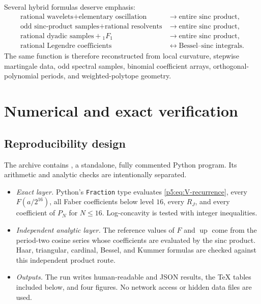 \documentclass[11pt,oneside]{article}
\theoremstyle{definition}
\newcommand{\Up}{\operatorname{up}}
\begin{document}
Several hybrid formulas deserve emphasis:
\begin{align}
 \text{rational wavelets}+\text{elementary oscillation}
 &\longrightarrow \text{entire sinc product},            \label{p5:eq:hybrid1}\\
 \text{odd sinc-product samples}+\text{rational resolvents}
 &\longrightarrow \text{entire sinc product},            \label{p5:eq:hybrid2}\\
 \text{rational dyadic samples}+{}_1F_1
 &\longrightarrow \text{entire sinc product},            \label{p5:eq:hybrid3}\\
 \text{rational Legendre coefficients}
 &\longleftrightarrow \text{Bessel--sinc integrals}.       \label{p5:eq:hybrid4}
\end{align}
The same function is therefore reconstructed from local curvature, stepwise
martingale data, odd spectral samples, binomial coefficient arrays,
orthogonal-polynomial periods, and weighted-polytope geometry.

\section{Numerical and exact verification}
\label{p5:sec:numerics}

\subsection{Reproducibility design}

The archive contains
, a standalone, fully commented
Python program.  Its arithmetic and analytic checks are intentionally
separated.

\begin{itemize}
\item \emph{Exact layer.}  Python's \texttt{Fraction} type evaluates
      \eqref{p5:eq:V-recurrence}, every $F(a/2^{16})$, all Faber coefficients
      below level $16$, every $R_J$, and every coefficient of $P_N$ for
      $N\le16$.  Log-concavity is tested with integer inequalities.
\item \emph{Independent analytic layer.}  The reference values of $F$ and
      $\Up$ come from the period-two cosine series whose coefficients are
      evaluated by the sinc product.  Haar, triangular, cardinal, Bessel, and
      Kummer formulas are checked against this independent product route.
\item \emph{Outputs.}  The run writes human-readable and JSON results, the
      TeX tables included below, and four figures.  No network access or
      hidden data files are used.
\end{itemize}
\end{document}
